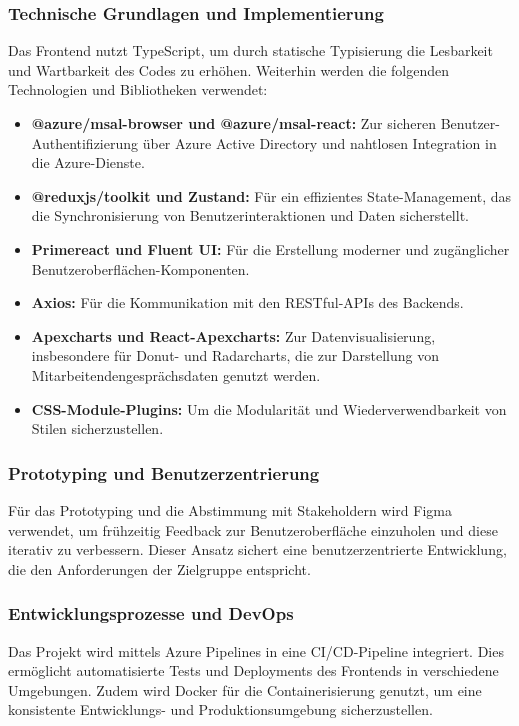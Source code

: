 \subsubsection*{Technische Grundlagen und Implementierung} 
Das Frontend nutzt TypeScript, um durch statische Typisierung die Lesbarkeit und Wartbarkeit des Codes zu erhöhen. Weiterhin werden die folgenden Technologien und Bibliotheken verwendet: 
\begin{itemize}
    \item \textbf{@azure/msal-browser und @azure/msal-react:} Zur sicheren Benutzer-Authentifizierung über Azure Active Directory und nahtlosen Integration in die Azure-Dienste.
    \item \textbf{@reduxjs/toolkit und Zustand:} Für ein effizientes State-Management, das die Synchronisierung von Benutzerinteraktionen und Daten sicherstellt.
    \item \textbf{Primereact und Fluent UI:} Für die Erstellung moderner und zugänglicher Benutzeroberflächen-Komponenten.
    \item \textbf{Axios:} Für die Kommunikation mit den RESTful-APIs des Backends.
    \item \textbf{Apexcharts und React-Apexcharts:} Zur Datenvisualisierung, insbesondere für Donut- und Radarcharts, die zur Darstellung von Mitarbeitendengesprächsdaten genutzt werden.
    \item \textbf{CSS-Module-Plugins:} Um die Modularität und Wiederverwendbarkeit von Stilen sicherzustellen.
\end{itemize}

\subsubsection*{Prototyping und Benutzerzentrierung} 
Für das Prototyping und die Abstimmung mit Stakeholdern wird Figma verwendet, um frühzeitig Feedback zur Benutzeroberfläche einzuholen und diese iterativ zu verbessern. Dieser Ansatz sichert eine benutzerzentrierte Entwicklung, die den Anforderungen der Zielgruppe entspricht.

\subsubsection*{Entwicklungsprozesse und DevOps} 
Das Projekt wird mittels Azure Pipelines in eine CI/CD-Pipeline integriert. Dies ermöglicht automatisierte Tests und Deployments des Frontends in verschiedene Umgebungen. Zudem wird Docker für die Containerisierung genutzt, um eine konsistente Entwicklungs- und Produktionsumgebung sicherzustellen.

